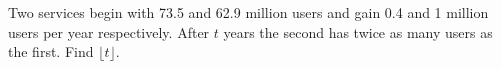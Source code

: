 Two services begin with 73.5 and 62.9 million users and gain 0.4 and 1 million users per year respectively. After $ t $ years the second has twice as many users as the first. Find $\lfloor t\rfloor $.

